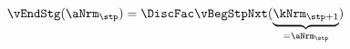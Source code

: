   \begin{equation}\begin{gathered}\begin{aligned}
\vEndStg(\aNrm_{\stp}) & = \DiscFac \vBegStpNxt(\underbrace{\kNrm_{\stp+1}}_{=\aNrm_{\stp}}) \label{eq:vEndStg}
      \end{aligned}\end{gathered}\end{equation}
